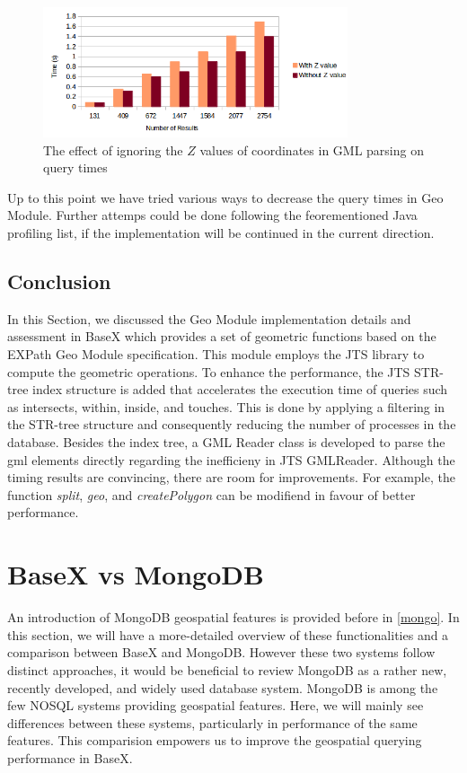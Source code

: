 \documentclass[a4paper,12pt]{article}
\begin{document}
\begin{figure}
\centering
\includegraphics[width=0.8\textwidth,height=0.2\textheight]{BXZvalue-sec}
\caption{The effect of ignoring the $Z$ values of coordinates in GML parsing on query times}
\label{figBXZvalue}
\end{figure}

Up to this point we have tried various ways to decrease the query times in Geo Module. Further attemps could be done following the feorementioned Java profiling list, if the implementation will be continued in the current direction.

\subsection{Conclusion}
\label{BXconc}
In this Section, we discussed the Geo Module implementation details and assessment in BaseX which provides a set of geometric functions based on the EXPath Geo Module specification. This module employs the JTS library to compute the geometric operations. To enhance the performance, the JTS STR-tree index structure is added that accelerates the execution time of queries such as intersects, within, inside, and touches. This is done by applying a filtering in the STR-tree structure and consequently reducing the number of processes in the database. Besides the index tree, a GML Reader class is developed to parse the gml elements directly regarding the inefficieny in JTS GMLReader. Although the timing results are convincing, there are room for improvements. For example, the function \textit{split}, \textit{geo}, and \textit{createPolygon} can be modifiend in favour of better performance.

\newpage
\section{BaseX vs MongoDB}
\label{s.mongo}

An introduction of MongoDB geospatial features is provided before in \ref{mongo}. In this section, we will have a more-detailed overview of these functionalities and a comparison between BaseX and MongoDB. However these two systems follow distinct approaches, it would be beneficial to review MongoDB as a rather new, recently developed, and widely used database system. MongoDB is among the few NOSQL systems providing geospatial features. Here, we will mainly see differences between these systems, particularly in performance of the same features. This comparision empowers us to improve the geospatial querying performance in BaseX. 
\end{document}
